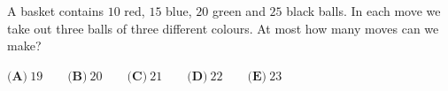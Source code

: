 A basket contains $10$ red, $15$ blue, $20$ green and $25$ black balls. In each move we take out three balls of three different colours. At most how many moves can we make?

$\textbf{(A)}\ 19\qquad\textbf{(B)}\ 20\qquad\textbf{(C)}\ 21\qquad\textbf{(D)}\ 22\qquad\textbf{(E)}\ 23$
